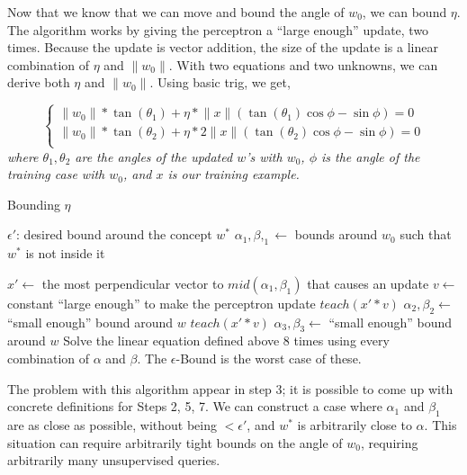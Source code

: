 \documentclass{article}
\begin{document}
Now that we know that we can move and bound the angle of $w_0$, we can bound
$\eta$. The algorithm works by giving the perceptron a ``large enough'' update,
two times. Because the update is vector addition, the size of the update is a
linear combination of $\eta$ and $\lVert w_0 \rVert$. With two equations and two
unknowns, we can derive both $\eta$ and $\lVert w_0 \rVert$. Using basic trig,
we get,

\[
  \begin{cases}
    \lVert w_0 \rVert * \tan(\theta_1) + \eta * \lVert x \rVert (\tan(\theta_1)  
    \cos{\phi} - \sin{\phi}) = 0 \\

    \lVert w_0 \rVert * \tan(\theta_2) + \eta * 2 \lVert x \rVert (\tan(\theta_2)
    \cos{\phi} - \sin{\phi}) = 0 \\
  \end{cases}
\]
\textit{where $\theta_1, \theta_2$ are the angles of the updated $w$'s with
  $w_0$, $\phi$ is the angle of the training case with $w_0$, and $x$ is our
  training example.}


\begin{algorithm}
\caption{Bounding $\eta$}
\begin{algorithmic}[1]
	\REQUIRE $\epsilon'$: desired bound around the concept $w^*$
  \STATE $\alpha_1, \beta,_1 \leftarrow$ bounds around $w_0$ such that $w^*$ is not
  inside it

  \STATE $x' \leftarrow $ the most perpendicular vector to $mid(\alpha_1, \beta_1)$
  that causes an update
  \STATE $v \leftarrow$ constant ``large enough'' to make the perceptron update
  \STATE $teach(x' * v)$
  \STATE $\alpha_2, \beta_2 \leftarrow$ ``small enough'' bound around $w$
  \STATE $teach(x' * v)$
  \STATE $\alpha_3, \beta_3 \leftarrow$ ``small enough'' bound around $w$
  \STATE Solve the linear equation defined above 8 times using every combination of
  $\alpha$ and $\beta$. The $\epsilon$-Bound is the worst case of these.
\end{algorithmic}
\end{algorithm}

The problem with this algorithm appear in step 3; it is possible to come up with
concrete definitions for Steps 2, 5, 7. We can construct a case where
$\alpha_1$ and $\beta_1$ are as close as possible, without being $ < \epsilon'$,
and $w^*$ is arbitrarily close to $\alpha$. This situation can require
arbitrarily tight bounds on the angle of $w_0$, requiring arbitrarily many
unsupervised queries.
\end{document}
